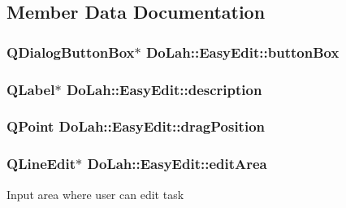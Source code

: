 \subsection{Member Data Documentation}
\hypertarget{class_do_lah_1_1_easy_edit_a1e4ffe1820e49d246fdb8e7e96c72ef5}{}
\subsubsection[{button\+Box}]{\setlength{\rightskip}{0pt plus 5cm}Q\+Dialog\+Button\+Box$\ast$ Do\+Lah\+::\+Easy\+Edit\+::button\+Box}\label{class_do_lah_1_1_easy_edit_a1e4ffe1820e49d246fdb8e7e96c72ef5}
\hypertarget{class_do_lah_1_1_easy_edit_ace3761bbfc57c6f2a01ba479c444a43d}{}
\subsubsection[{description}]{\setlength{\rightskip}{0pt plus 5cm}Q\+Label$\ast$ Do\+Lah\+::\+Easy\+Edit\+::description}\label{class_do_lah_1_1_easy_edit_ace3761bbfc57c6f2a01ba479c444a43d}
\hypertarget{class_do_lah_1_1_easy_edit_a4f038cda09358f83aaaba492c7e01b0a}{}
\subsubsection[{drag\+Position}]{\setlength{\rightskip}{0pt plus 5cm}Q\+Point Do\+Lah\+::\+Easy\+Edit\+::drag\+Position\hspace{0.3cm}{\ttfamily [private]}}\label{class_do_lah_1_1_easy_edit_a4f038cda09358f83aaaba492c7e01b0a}
\hypertarget{class_do_lah_1_1_easy_edit_af0fcb4b23998a319e187da309748e319}{}
\subsubsection[{edit\+Area}]{\setlength{\rightskip}{0pt plus 5cm}Q\+Line\+Edit$\ast$ Do\+Lah\+::\+Easy\+Edit\+::edit\+Area}\label{class_do_lah_1_1_easy_edit_af0fcb4b23998a319e187da309748e319}
Input area where user can edit task \hypertarget{class_do_lah_1_1_easy_edit_ae92382bcf128f607904cc76dcdca07fa}{}
